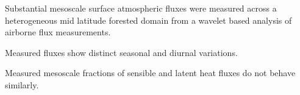 \documentclass[draft]{agujournal2019}
\begin{document}








\begin{keypoints}
\item Substantial mesoscale surface atmospheric fluxes were measured across a heterogeneous mid latitude forested domain from a wavelet based analysis of airborne flux measurements.
\item Measured fluxes show distinct seasonal and diurnal variations.
\item Measured mesoscale fractions of sensible and latent heat fluxes do not behave similarly.
\end{keypoints}

%
%
\end{document}
